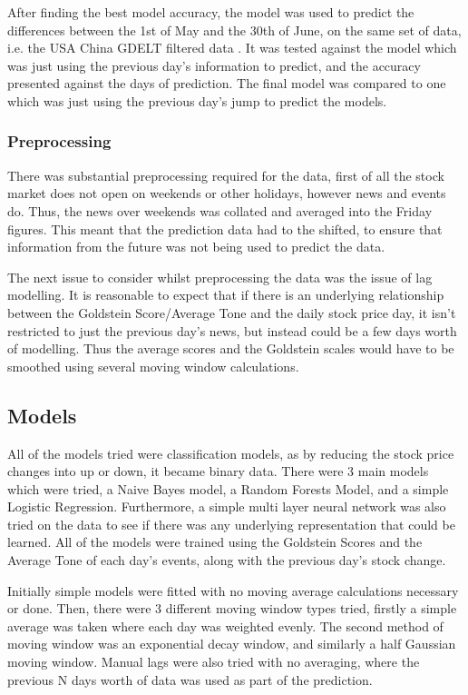 After finding the best model accuracy, the model was used to predict the differences between the 1st of May and the 30th of June, on the same set of data, i.e. the USA China GDELT filtered data . It was tested against the model which was just using the previous day's information to predict, and the accuracy presented against the days of prediction. The final model was compared to one which was just using the previous day's jump to predict the models. 

\subsubsection{Preprocessing}
There was substantial preprocessing required for the data, first of all the stock market does not open on weekends or other holidays, however news and events do. Thus, the news over weekends was collated and averaged into the Friday figures. This meant that the prediction data had to the shifted, to ensure that information from the future was not being used to predict the data.

The next issue to consider whilst preprocessing the data was the issue of lag modelling. It is reasonable to expect that if there is an underlying relationship between the Goldstein Score/Average Tone and the daily stock price day, it isn't restricted to just the previous day's news, but instead could be a few days worth of modelling. Thus the average scores and the Goldstein scales would have to be smoothed using several moving window calculations.

\subsection{Models}
All of the models tried were classification models, as by reducing the stock price changes into up or down, it became binary data. There were 3 main models which were tried, a Naive Bayes model, a Random Forests Model, and a simple Logistic Regression. Furthermore, a simple multi layer neural network was also tried on the data to see if there was any underlying representation that could be learned. All of the models were trained using the Goldstein Scores and the Average Tone of each day's events, along with the previous day's stock change. 

Initially simple models were fitted with no moving average calculations necessary or done. Then, there were 3 different moving window types tried, firstly a simple average was taken where each day was weighted evenly. The second method of moving window was an exponential decay window, and similarly a half Gaussian moving window. Manual lags were also tried with no averaging, where the previous N days worth of data was used as part of the prediction. 